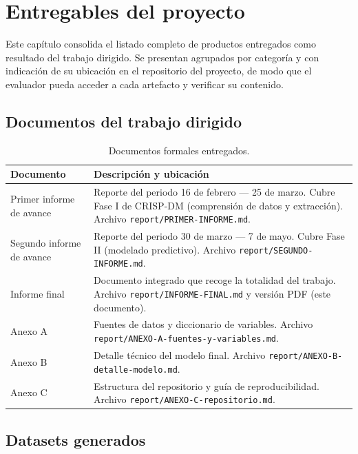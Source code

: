 \documentclass[12pt,letterpaper,oneside]{report}
\begin{document}
\chapter{Entregables del proyecto}
\label{cap:entregables}

Este capítulo consolida el listado completo de productos entregados como
resultado del trabajo dirigido. Se presentan agrupados por categoría y con
indicación de su ubicación en el repositorio del proyecto, de modo que el
evaluador pueda acceder a cada artefacto y verificar su contenido.

\section{Documentos del trabajo dirigido}

\begin{table}[H]
\centering
\caption{Documentos formales entregados.}
\label{tab:doc_entregados}
\small
\begin{tabular}{p{5cm}p{9cm}}
\toprule
\textbf{Documento} & \textbf{Descripción y ubicación} \\
\midrule
Primer informe de avance & Reporte del periodo 16 de febrero --- 25 de marzo. Cubre Fase I de CRISP-DM (comprensión de datos y extracción). Archivo \texttt{report/PRIMER-INFORME.md}. \\
Segundo informe de avance & Reporte del periodo 30 de marzo --- 7 de mayo. Cubre Fase II (modelado predictivo). Archivo \texttt{report/SEGUNDO-INFORME.md}. \\
Informe final & Documento integrado que recoge la totalidad del trabajo. Archivo \texttt{report/INFORME-FINAL.md} y versión PDF (este documento). \\
Anexo A & Fuentes de datos y diccionario de variables. Archivo \texttt{report/ANEXO-A-fuentes-y-variables.md}. \\
Anexo B & Detalle técnico del modelo final. Archivo \texttt{report/ANEXO-B-detalle-modelo.md}. \\
Anexo C & Estructura del repositorio y guía de reproducibilidad. Archivo \texttt{report/ANEXO-C-repositorio.md}. \\
\bottomrule
\end{tabular}
\end{table}

\section{Datasets generados}
\end{document}
